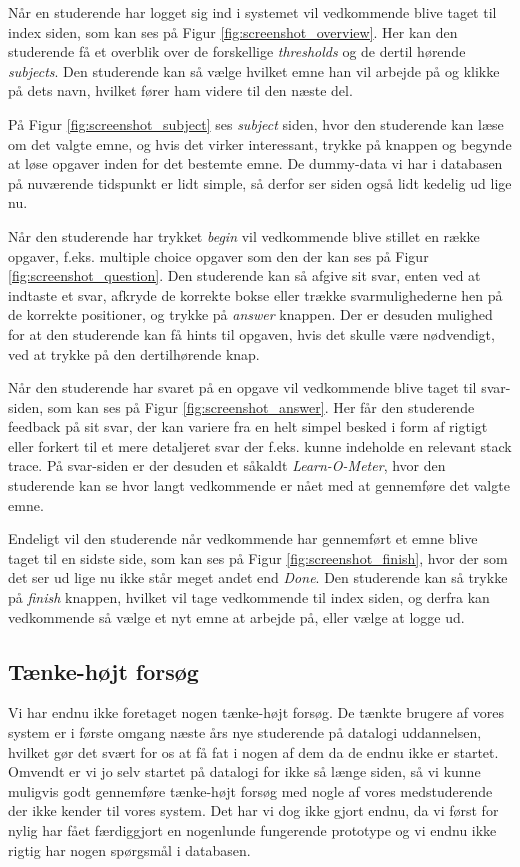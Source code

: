\documentclass[11pt, a4paper]{article}
\begin{document}
Når en studerende har logget sig ind i systemet vil vedkommende blive taget til index siden, som kan ses på Figur \ref{fig:screenshot_overview}. Her kan den studerende få et overblik over de forskellige \emph{thresholds} og de dertil hørende \emph{subjects}. Den studerende kan så vælge hvilket emne han vil arbejde på og klikke på dets navn, hvilket fører ham videre til den næste del.

På Figur \ref{fig:screenshot_subject} ses \emph{subject} siden, hvor den studerende kan læse om det valgte emne, og hvis det virker interessant, trykke på knappen og begynde at løse opgaver inden for det bestemte emne. De dummy-data vi har i databasen på nuværende tidspunkt er lidt simple, så derfor ser siden også lidt kedelig ud lige nu.

Når den studerende har trykket \emph{begin} vil vedkommende blive stillet en række opgaver, f.eks. multiple choice opgaver som den der kan ses på Figur \ref{fig:screenshot_question}. Den studerende kan så afgive sit svar, enten ved at indtaste et svar, afkryde de korrekte bokse eller trække svarmulighederne hen på de korrekte positioner, og trykke på \emph{answer} knappen. Der er desuden mulighed for at den studerende kan få hints til opgaven, hvis det skulle være nødvendigt, ved at trykke på den dertilhørende knap.

Når den studerende har svaret på en opgave vil vedkommende blive taget til svar-siden, som kan ses på Figur \ref{fig:screenshot_answer}. Her får den studerende feedback på sit svar, der kan variere fra en helt simpel besked i form af rigtigt eller forkert til et mere detaljeret svar der f.eks. kunne indeholde en relevant stack trace. På svar-siden er der desuden et såkaldt \emph{Learn-O-Meter}, hvor den studerende kan se hvor langt vedkommende er nået med at gennemføre det valgte emne.

Endeligt vil den studerende når vedkommende har gennemført et emne blive taget til en sidste side, som kan ses på Figur \ref{fig:screenshot_finish}, hvor der som det ser ud lige nu ikke står meget andet end \emph{Done}. Den studerende kan så trykke på \emph{finish} knappen, hvilket vil tage vedkommende til index siden, og derfra kan vedkommende så vælge et nyt emne at arbejde på, eller vælge at logge ud.

\subsection{Tænke-højt forsøg}
Vi har endnu ikke foretaget nogen tænke-højt forsøg. De tænkte brugere af vores system er i første omgang næste års nye studerende på datalogi uddannelsen, hvilket gør det svært for os at få fat i nogen af dem da de endnu ikke er startet. Omvendt er vi jo selv startet på datalogi for ikke så længe siden, så vi kunne muligvis godt gennemføre tænke-højt forsøg med nogle af vores medstuderende der ikke kender til vores system. Det har vi dog ikke gjort endnu, da vi først for nylig har fået færdiggjort en nogenlunde fungerende prototype og vi endnu ikke rigtig har nogen spørgsmål i databasen.
\end{document}
